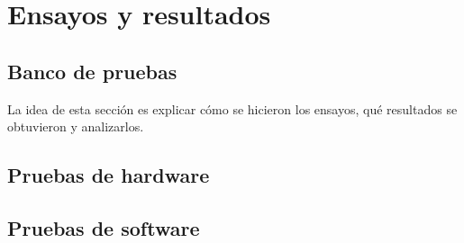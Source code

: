 
\chapter{Ensayos y resultados} %

\label{Chapter4} %


\section{Banco de pruebas}
\label{sec:pruebasHW}

La idea de esta sección es explicar cómo se hicieron los ensayos, qué resultados se obtuvieron y analizarlos.

\section{Pruebas de hardware}

\section{Pruebas de software}